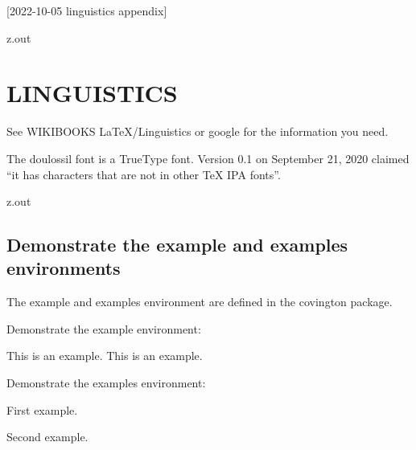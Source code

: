 [2022-10-05 linguistics appendix]

\begin{VerbatimOut}{z.out}
\chapter{LINGUISTICS}

See WIKIBOOKS \LaTeX/Linguistics \cite{wikibooks-latex-linguistics}
or google for the information you need.

The doulossil font
\cite{tambe2020}
is a TrueType font.
Version 0.1 on September 21, 2020 claimed
``it has characters that are not in other TeX IPA fonts''.
\end{VerbatimOut}

\MyIO


\begin{VerbatimOut}{z.out}


\section{Demonstrate the example and examples environments}

The example and examples environment
are defined
in the covington
\cite{covington2021}
package.

Demonstrate the example environment:
\begin{example}
  This is an example.
  This is an example.
\end{example}

Demonstrate the examples environment:
\begin{examples}
  \item First example.
  \item Second example.
\end{examples}
\end{VerbatimOut}

\MyIO
